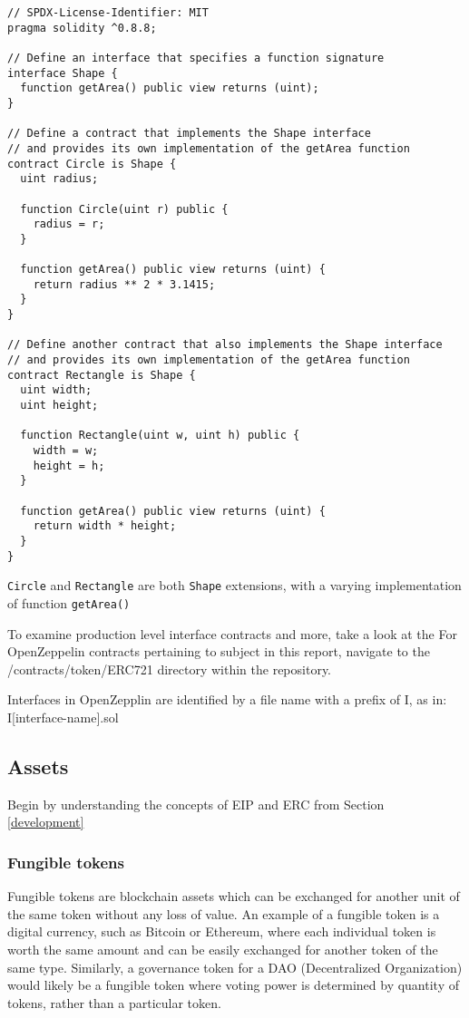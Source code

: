 \documentclass{article}
\theoremstyle{theorem}
\theoremstyle{definition}
\theoremstyle{remark}
\begin{document}
\begin{itemize}
\begin{lstlisting}
// SPDX-License-Identifier: MIT
pragma solidity ^0.8.8;

// Define an interface that specifies a function signature
interface Shape {
  function getArea() public view returns (uint);
}

// Define a contract that implements the Shape interface
// and provides its own implementation of the getArea function
contract Circle is Shape {
  uint radius;

  function Circle(uint r) public {
    radius = r;
  }

  function getArea() public view returns (uint) {
    return radius ** 2 * 3.1415;
  }
}

// Define another contract that also implements the Shape interface
// and provides its own implementation of the getArea function
contract Rectangle is Shape {
  uint width;
  uint height;

  function Rectangle(uint w, uint h) public {
    width = w;
    height = h;
  }

  function getArea() public view returns (uint) {
    return width * height;
  }
}

\end{lstlisting}
\end{itemize}
\noindent
\texttt{Circle} and \texttt{Rectangle} are both \texttt{Shape} extensions, with a varying implementation of function \texttt{getArea()}

\medskip\noindent
To examine production level interface contracts and more, take a look at the \cite{OZ} For OpenZeppelin contracts pertaining to subject in this report, navigate to the \colorbox{Gainsboro!60!Lavender}{/contracts/token/ERC721} directory within the repository. 

\medskip\noindent
Interfaces in OpenZepplin are identified by a file name with a prefix of \colorbox{Gainsboro!60!Lavender}{I}, as in: \colorbox{Gainsboro!60!Lavender}{I[interface-name].sol}

 \medskip

\subsection{Assets} \label{erc}
\medskip
Begin by understanding the concepts of EIP and ERC from Section \ref{development}

\subsubsection{Fungible tokens } 
Fungible tokens are blockchain assets which can be exchanged for another unit of the same token without any loss of value. An example of a fungible token is a digital currency, such as Bitcoin or Ethereum, where each individual token is worth the same amount and can be easily exchanged for another token of the same type. Similarly, a governance token for a DAO (Decentralized Organization) would likely be a fungible token where voting power is determined by quantity of tokens, rather than a particular token.
\end{document}
